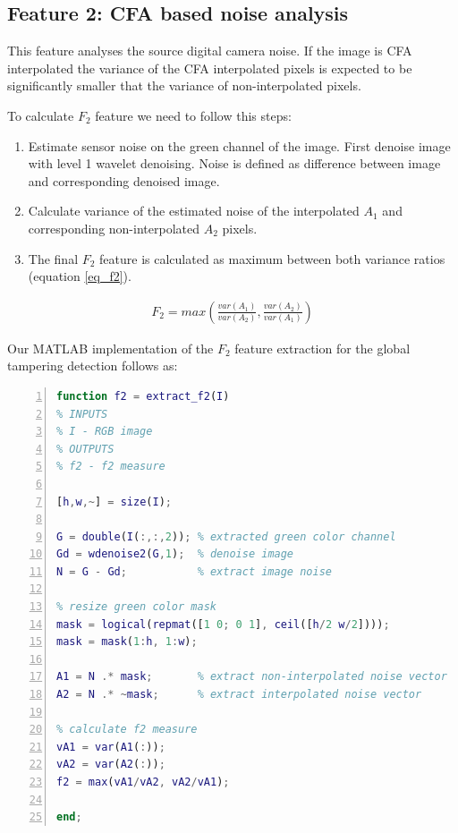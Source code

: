 \documentclass{template/acm_proc_article-sp}
\begin{document}
\subsection{Feature 2: CFA based noise analysis}
\label{sec_f2}
This feature analyses the source digital camera noise. If the image is CFA interpolated the variance of the CFA interpolated pixels is expected to be significantly smaller that the variance of non-interpolated pixels.

To calculate $F_2$ feature we need to follow this steps:
\begin{enumerate}
    \item Estimate sensor noise on the green channel of the image. First denoise image with level 1 wavelet denoising. Noise is defined as difference between image and corresponding denoised image.
    \item Calculate variance of the estimated noise of the interpolated $A_1$ and corresponding non-interpolated $A_2$ pixels.
    \item The final $F_2$ feature is calculated as maximum between both variance ratios (equation \ref{eq_f2}).
\end{enumerate}

\begin{align}
F_2 = max(\frac{var(A_1)}{var(A_2)}, \frac{var(A_2)}{var(A_1)})
\label{eq_f2}
\end{align}

Our MATLAB implementation of the $F_2$ feature extraction for the global tampering detection follows as:

\begin{lstlisting}[language=Matlab,basicstyle=\tiny,numberstyle=\tiny,numbers=left,numbersep=5pt]
function f2 = extract_f2(I)
% INPUTS
% I - RGB image
% OUTPUTS
% f2 - f2 measure

[h,w,~] = size(I);

G = double(I(:,:,2)); % extracted green color channel
Gd = wdenoise2(G,1);  % denoise image
N = G - Gd;           % extract image noise            

% resize green color mask
mask = logical(repmat([1 0; 0 1], ceil([h/2 w/2])));
mask = mask(1:h, 1:w);

A1 = N .* mask;       % extract non-interpolated noise vector
A2 = N .* ~mask;      % extract interpolated noise vector

% calculate f2 measure
vA1 = var(A1(:));
vA2 = var(A2(:)); 
f2 = max(vA1/vA2, vA2/vA1);

end;
\end{lstlisting}
\end{document}
